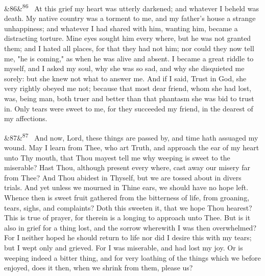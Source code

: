 \documentclass[12pt]{article}
\newcommand{\para}[1][]{\par\noindent\ifx&#1&\else\textsuperscript{\footnotesize #1}~\fi}
\begin{document}
\para[86] At this grief my heart was utterly darkened; and whatever I beheld was death. My native country was a torment to me, and my father's house a strange unhappiness; and whatever I had shared with him, wanting him, became a distracting torture. Mine eyes sought him every where, but he was not granted them; and I hated all places, for that they had not him; nor could they now tell me, "he is coming," as when he was alive and absent. I became a great riddle to myself, and I asked my soul, why she was so sad, and why she disquieted me sorely: but she knew not what to answer me. And if I said, Trust in God, she very rightly obeyed me not; because that most dear friend, whom she had lost, was, being man, both truer and better than that phantasm she was bid to trust in. Only tears were sweet to me, for they succeeded my friend, in the dearest of my affections.

\para[87] And now, Lord, these things are passed by, and time hath assuaged my wound. May I learn from Thee, who art Truth, and approach the ear of my heart unto Thy mouth, that Thou mayest tell me why weeping is sweet to the miserable? Hast Thou, although present every where, cast away our misery far from Thee? And Thou abidest in Thyself, but we are tossed about in divers trials. And yet unless we mourned in Thine ears, we should have no hope left. Whence then is sweet fruit gathered from the bitterness of life, from groaning, tears, sighs, and complaints? Doth this sweeten it, that we hope Thou hearest? This is true of prayer, for therein is a longing to approach unto Thee. But is it also in grief for a thing lost, and the sorrow wherewith I was then overwhelmed? For I neither hoped he should return to life nor did I desire this with my tears; but I wept only and grieved. For I was miserable, and had lost my joy. Or is weeping indeed a bitter thing, and for very loathing of the things which we before enjoyed, does it then, when we shrink from them, please us?
\end{document}
